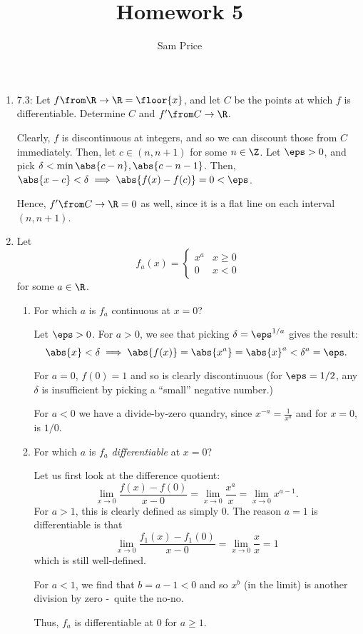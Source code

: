 \documentclass{article}
\author{Sam Price}
\date{}
\title{Homework 5}
\begin{document}
\maketitle

\begin{enumerate}

  \item 7.3: Let $f \from \R \to \R = \floor{x}$, and let $C$ be the points at which $f$ is differentiable.
        Determine $C$ and $f' \from C \to \R$.

        Clearly, $f$  is discontinuous at integers, and so we can discount those from $C$ immediately. Then, let $c \in (n, n + 1)$ for some $n \in \Z$.
        Let $\eps > 0$, and pick $\delta < \min{\abs{c - n}, \abs{c - n - 1}}$. Then, $\abs{x - c} < \delta \implies \abs{f(x) - f(c)} = 0 < \eps$.

        Hence, $f'\from C \to \R = 0$ as well, since it is a flat line on each interval $(n, n + 1)$.

  \item Let
        \[ f_{a}(x) = \begin{cases} x^{a} & x \ge 0\\ 0 & x < 0 \end{cases} \]
        for some $a \in \R$.

        \begin{enumerate}
          \item For which $a$ is $f_{a}$ continuous at $x = 0$?

                Let $\eps > 0$.
                For $a > 0$, we see that picking $\delta = \eps^{1/a}$
                gives the result:
                \[ \abs{x} < \delta \implies \abs{f(x)} = \abs{x^{a}} = \abs{x}^{a} < \delta^{a} = \eps. \]

                For $a = 0$, $f(0) = 1$ and so is clearly discontinuous (for $\eps = 1/2$, any $\delta$ is insufficient by picking a ``small'' negative number.)

                For $a < 0$ we have a divide-by-zero quandry, since $x^{-a} = \frac{1}{x^{a}}$ and for $x = 0$, is $1/0$.

          \item For which $a$ is $f_{a}$ \emph{differentiable} at $x = 0$?

                Let us first look at the difference quotient:
                \[ \lim_{x \to 0}\frac{f(x) - f(0)}{x - 0} = \lim_{x \to 0}\frac{x^{a}}{x} = \lim_{x \to 0} x^{a-1}.\]
                For $a > 1$, this is clearly defined as simply 0.
                The reason $a = 1$ is differentiable is that
                \[ \lim_{x \to 0}\frac{f_{1}(x) - f_{1}(0)}{x - 0} = \lim_{x\to0}\frac{x}{x} = 1 \]
                which is still well-defined.

                For $a < 1$, we find that $b = a - 1 < 0$ and so $x^{b}$ (in the limit) is another division by zero -\ quite the no-no.

                Thus, $f_{a}$ is differentiable at 0 for $a \ge 1$.

        \end{enumerate}

\end{enumerate}
\end{document}
